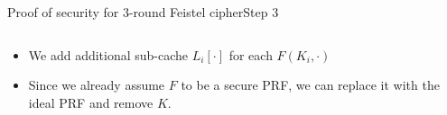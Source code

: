 \documentclass[aspectratio=169, lualatex, handout]{beamer}
\begin{document}
\begin{frame}{Proof of security for 3-round Feistel cipher}{Step 3}
	\begin{columns}[c]
		\begin{column}{0.5\textwidth}
			\begin{itemize}[<+->]
				\item We add additional sub-cache $L_i[\cdot]$ for each $F(K_i,\cdot)$
				\item Since we already assume $F$ to be a secure PRF, we can replace it with the ideal PRF and remove $K$.
			\end{itemize}
		\end{column}
		\begin{column}{0.5\textwidth}
			\vspace{-1.5cm}
			\begin{center}
			\end{center}
		\end{column}
	\end{columns}
\end{frame}
\end{document}
